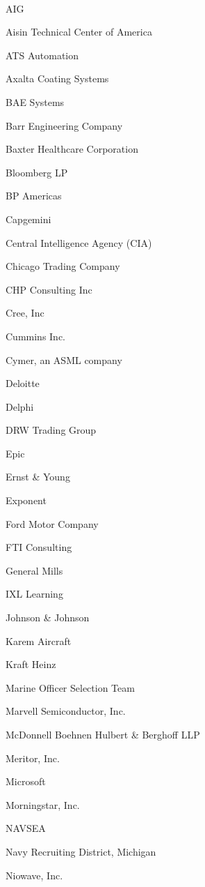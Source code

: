 \documentclass[twoside]{article}
\begin{document}
\begin{center}
\begin{multicols}{5}
        ~\hrulefill~
        \vspace{-.9em}
        \begin{FlushLeft}
        \begin{compactitem}
        \item AIG
\item Aisin Technical Center of America
\item ATS Automation
\item Axalta Coating Systems
\item BAE Systems
\item Barr Engineering Company
\item Baxter Healthcare Corporation
\item Bloomberg LP
\item BP Americas
\item Capgemini
\item Central Intelligence Agency (CIA)
\item Chicago Trading Company
\item CHP Consulting Inc
\item Cree, Inc
\item Cummins Inc.
\item Cymer, an ASML company
\item Deloitte
\item Delphi
\item DRW Trading Group
\item Epic
\item Ernst \& Young
\item Exponent
\item Ford Motor Company
\item FTI Consulting
\item General Mills
\item IXL Learning
\item Johnson \& Johnson
\item Karem Aircraft
\item Kraft Heinz
\item Marine Officer Selection Team
\item Marvell Semiconductor, Inc.
\item McDonnell Boehnen Hulbert \& Berghoff LLP
\item Meritor, Inc.
\item Microsoft
\item Morningstar, Inc.
\item NAVSEA
\item Navy Recruiting District, Michigan
\item Niowave, Inc.

\end{compactitem}
\end{FlushLeft}
\end{multicols}
\end{center}
\end{document}
